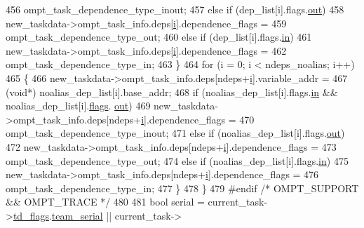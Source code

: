 \begin{DoxyCode}
{456                   ompt\_task\_dependence\_type\_inout;
457             \textcolor{keywordflow}{else} \textcolor{keywordflow}{if} (dep\_list[i].flags.\hyperlink{structkmp__depend__info_ad2f4d34c0d6aa127073c9e21a5041244}{out})
458                 new\_taskdata->ompt\_task\_info.deps[\hyperlink{kmp__stub_8c_a08582ce460e3d5e1cf0b7fea017d608e}{i}].dependence\_flags =
459                   ompt\_task\_dependence\_type\_out;
460             \textcolor{keywordflow}{else} \textcolor{keywordflow}{if} (dep\_list[i].flags.\hyperlink{structkmp__depend__info_a65b239cf11dd7d59dc86eb9ab5f6e414}{in})
461                 new\_taskdata->ompt\_task\_info.deps[\hyperlink{kmp__stub_8c_a08582ce460e3d5e1cf0b7fea017d608e}{i}].dependence\_flags =
462                   ompt\_task\_dependence\_type\_in;
463         \}
464         \textcolor{keywordflow}{for} (i = 0; i < ndeps\_noalias; i++)
465         \{
466             new\_taskdata->ompt\_task\_info.deps[ndeps+\hyperlink{kmp__stub_8c_a08582ce460e3d5e1cf0b7fea017d608e}{i}].variable\_addr =
467               (\textcolor{keywordtype}{void}*) noalias\_dep\_list[i].base\_addr;
468             \textcolor{keywordflow}{if} (noalias\_dep\_list[i].flags.\hyperlink{structkmp__depend__info_a65b239cf11dd7d59dc86eb9ab5f6e414}{in} && noalias\_dep\_list[i].\hyperlink{structkmp__depend__info_aa36eee45c425e2a66beb059660c9fb63}{flags}.
      \hyperlink{structkmp__depend__info_ad2f4d34c0d6aa127073c9e21a5041244}{out})
469                 new\_taskdata->ompt\_task\_info.deps[ndeps+\hyperlink{kmp__stub_8c_a08582ce460e3d5e1cf0b7fea017d608e}{i}].dependence\_flags =
470                   ompt\_task\_dependence\_type\_inout;
471             \textcolor{keywordflow}{else} \textcolor{keywordflow}{if} (noalias\_dep\_list[i].flags.\hyperlink{structkmp__depend__info_ad2f4d34c0d6aa127073c9e21a5041244}{out})
472                 new\_taskdata->ompt\_task\_info.deps[ndeps+\hyperlink{kmp__stub_8c_a08582ce460e3d5e1cf0b7fea017d608e}{i}].dependence\_flags =
473                   ompt\_task\_dependence\_type\_out;
474             \textcolor{keywordflow}{else} \textcolor{keywordflow}{if} (noalias\_dep\_list[i].flags.\hyperlink{structkmp__depend__info_a65b239cf11dd7d59dc86eb9ab5f6e414}{in})
475                 new\_taskdata->ompt\_task\_info.deps[ndeps+\hyperlink{kmp__stub_8c_a08582ce460e3d5e1cf0b7fea017d608e}{i}].dependence\_flags =
476                   ompt\_task\_dependence\_type\_in;
477         \}
478     \}
479 \textcolor{preprocessor}{#endif }\textcolor{comment}{/* OMPT\_SUPPORT && OMPT\_TRACE */}\textcolor{preprocessor}{}
480 \textcolor{preprocessor}{}
481     \textcolor{keywordtype}{bool} serial = current\_task->\hyperlink{structkmp__taskdata_aa6380b6723d2482345a1e6cffcd15e9f}{td\_flags}.\hyperlink{structkmp__tasking__flags_a69abf7c2ecf0b7284861a90c7ac0cfe1}{team\_serial} || current\_task->
}
\end{DoxyCode}
